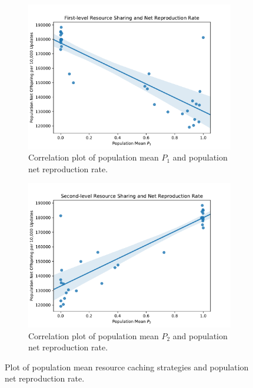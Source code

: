\begin{figure}[t]
\begin{center}

\begin{subfigure}[b]{\columnwidth}
  \includegraphics[width=\columnwidth]{img/mean_res_pool1_vs_net_reproduction}
  \caption{
  Correlation plot of population mean $P_1$ and population net reproduction rate.
  }
  \label{fig:mean_res_pool1_vs_net_reproduction}
\end{subfigure}

\begin{subfigure}[b]{\columnwidth}
  \includegraphics[width=\columnwidth]{img/mean_res_pool2_vs_net_reproduction}
  \caption{
  Correlation plot of population mean $P_2$ and population net reproduction rate.
  }
  \label{fig:mean_res_pool2_vs_net_reproduction}
\end{subfigure}

\caption{
Plot of population mean resource caching strategies and population net reproduction rate.
}
\label{fig:net_reproduction}
\end{center}
\end{figure}
